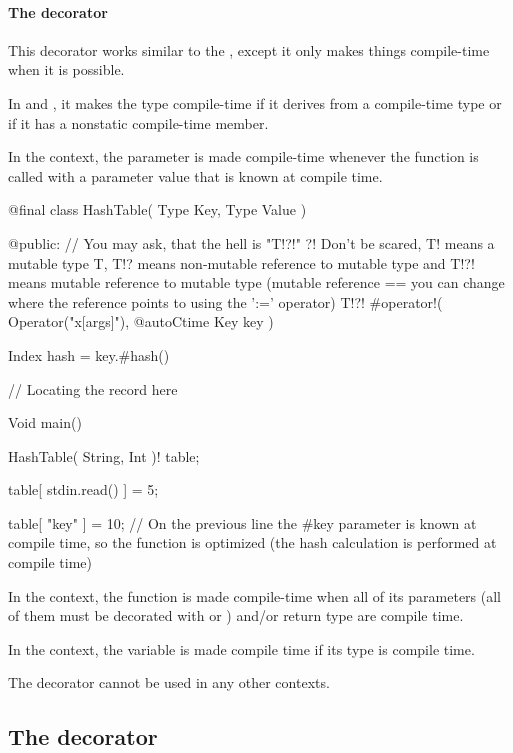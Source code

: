 \paragraph{The  decorator} \label{decorator:autoCtime} This decorator works similar to the , except it only makes things compile-time when it is possible.

In  and , it makes the type compile-time if it derives from a compile-time type or if it has a nonstatic compile-time member.

In the  context, the parameter is made compile-time whenever the function is called with a parameter value that is known at compile time.
\begin{code}
@final class HashTable( Type Key, Type Value ) {

@public:
	// You may ask, that the hell is "T!?!" ?! Don't be scared, T! means a mutable type T, T!? means non-mutable reference to mutable type and T!?! means mutable reference to mutable type (mutable reference == you can change where the reference points to using the ':=' operator)
	T!?! #operator!( Operator("x[args]"), @autoCtime Key key ) {
		Index hash = key.#hash() %
		
		// Locating the record here 
	}
	
}

Void main() {
	HashTable( String, Int )! table;
	
	table[ stdin.read() ] = 5;
	
	table[ "key" ] = 10;
	// On the previous line the #key parameter is known at compile time, so the function is optimized (the hash calculation is performed at compile time)
}
\end{code}

In the  context, the function is made compile-time when all of its parameters (all of them must be decorated with  or ) and/or return type are compile time.

In the  context, the variable is made compile time if its type is compile time.

The decorator cannot be used in any other contexts.

\subsection{The  decorator} \label{decorator:noscope}

